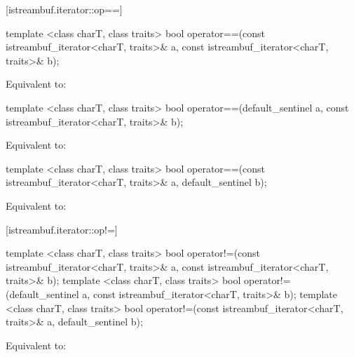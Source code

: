 [istreambuf.iterator::op==]{}

%
\begin{itemdecl}
template <class charT, class traits>
  bool operator==(const istreambuf_iterator<charT, traits>& a,
                  const istreambuf_iterator<charT, traits>& b);
\end{itemdecl}

\begin{itemdescr}
\pnum
\effects Equivalent to:
\end{itemdescr}

\begin{itemdecl}
template <class charT, class traits>
  bool operator==(default_sentinel a,
                  const istreambuf_iterator<charT, traits>& b);
\end{itemdecl}

\begin{itemdescr}
\pnum
\effects Equivalent to:
\end{itemdescr}

\begin{itemdecl}
template <class charT, class traits>
  bool operator==(const istreambuf_iterator<charT, traits>& a,
                  default_sentinel b);
\end{itemdecl}

\begin{itemdescr}
\pnum
\effects Equivalent to:
\end{itemdescr}

[istreambuf.iterator::op!=]{}

%
\begin{itemdecl}
template <class charT, class traits>
  bool operator!=(const istreambuf_iterator<charT, traits>& a,
                  const istreambuf_iterator<charT, traits>& b);
template <class charT, class traits>
  bool operator!=(default_sentinel a,
                  const istreambuf_iterator<charT, traits>& b);
template <class charT, class traits>
  bool operator!=(const istreambuf_iterator<charT, traits>& a,
                  default_sentinel b);
\end{itemdecl}

\begin{itemdescr}
\pnum
\effects Equivalent to:
\end{itemdescr}

